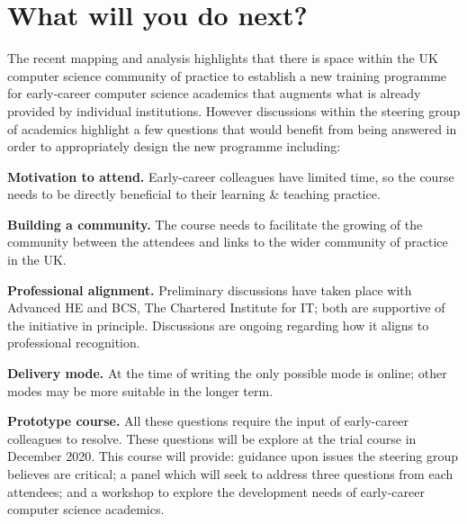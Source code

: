 \documentclass[sigconf]{acmart}
\begin{document}
\section{What will you do next?}
\setdefaultleftmargin{0em}{2em}{}{}{}{}
The recent mapping and analysis highlights that there is space within the UK computer science community of practice to establish a new training programme for early-career computer science academics that augments what is already provided by individual institutions. However discussions within the steering group of academics highlight a few questions that would benefit from being answered in order to appropriately design the new programme including:
\begin{compactitem}
	\item \textbf{Motivation to attend.} Early-career colleagues
          have limited time, so the course needs to be directly
          beneficial to their learning \& teaching practice.
	\item \textbf{Building a community.} The course needs to facilitate the growing of the community between the attendees and links to the wider community of practice in the UK.
	\item \textbf{Professional alignment.} Preliminary discussions
          have taken place with Advanced HE and BCS, The
          Chartered Institute for IT; both are supportive of the
          initiative in principle. Discussions are ongoing regarding
          how it aligns to professional recognition.
	\item \textbf{Delivery mode.} At the time of writing the only
          possible mode is online; other modes may be more suitable in the longer term.
	\item \textbf{Prototype course.} All these questions require
          the input of early-career colleagues to resolve. These
          questions will be explore at the trial course in December 2020. This course will provide: guidance upon issues the steering group believes are critical; a panel which will seek to address three questions from each attendees; and a workshop to explore the development needs of early-career computer science academics. 
\end{compactitem}
 
\end{document}
